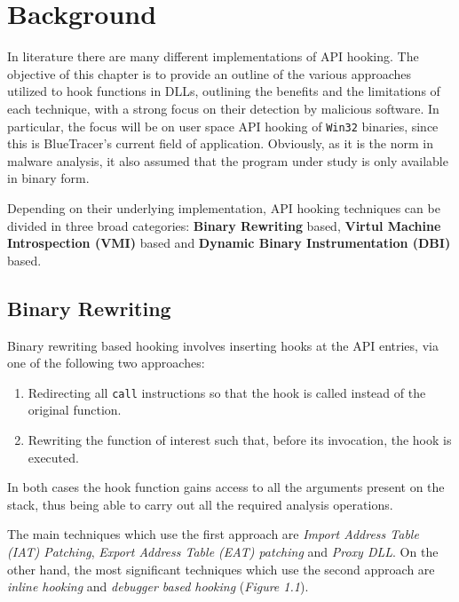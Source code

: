 
\chapter{Background}

In literature there are many different implementations of API hooking. The objective of this chapter is to provide an outline of the various approaches utilized to hook functions in DLLs, outlining the benefits and the limitations of each technique, with a strong focus on their detection by malicious software. In particular, the focus will be on user space API hooking of \texttt{Win32} binaries, since this is BlueTracer's current field of application. Obviously, as it is the norm in malware analysis, it also assumed that the program under study is only available in binary form.

Depending on their underlying implementation, API hooking techniques can be divided in three broad categories: \textbf{Binary Rewriting} based, \textbf{Virtul Machine Introspection (VMI)} based and \textbf{Dynamic Binary Instrumentation (DBI)} based.   

\section{Binary Rewriting}

Binary rewriting based hooking involves inserting hooks at the API entries, via one of the following two approaches:
\begin{enumerate}
\item Redirecting all \texttt{call} instructions so that the hook is called instead of the original function.
\item Rewriting the function of interest such that, before its invocation, the hook is executed. 
\end{enumerate} 

In both cases the hook function gains access to all the arguments present on the stack, thus being able to carry out all the required analysis operations.

The main techniques which use the first approach are \textit{Import Address Table (IAT) Patching}, \textit{Export Address Table (EAT) patching} and \textit{Proxy DLL}. On the other hand, the most significant techniques which use the second approach are \textit{inline hooking} and \textit{debugger based hooking} (\textit{Figure 1.1}).



